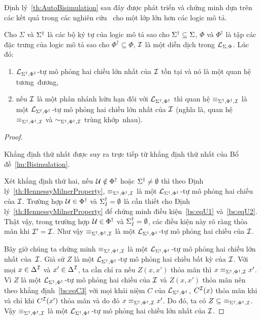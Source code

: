 Định lý~\ref{th:AutoBisimulation} sau đây được phát triển và chứng minh dựa trên các kết quả trong các nghiên cứu~\cite{Divroodi2011B,Nguyen2013} cho một lớp lớn hơn các logic mô tả.

\begin{Theorem} 
\label{th:AutoBisimulation}
	Cho $\Sigma$ và $\Sigma^\dag$ là các bộ ký tự của logic mô tả sao cho $\Sigma^\dag \subseteq \Sigma$, $\Phi$ và $\Phi^\dag$ là tập các đặc trưng của logic mô tả sao cho $\Phi^\dag \subseteq \Phi$, $\mathcal{I}$ là một diễn dịch trong $\mathcal{L}_{\Sigma,\Phi}$. Lúc đó:
	\begin{enumerate}
		\item $\mathcal{L}_{\Sigma^\dag,\Phi^\dag}$-tự mô phỏng hai chiều lớn nhất của $\mathcal{I}$ tồn tại và nó là một quan hệ tương~đương,\label{th:AutoBisimulation-item1}  
		\item nếu $\mathcal{I}$ là một phân nhánh hữu hạn đối với $\mathcal{L}_{\Sigma^\dag,\Phi^\dag}$ thì quan hệ $\equiv_{\Sigma^\dag,\Phi^\dag,\mathcal{I}}$ là một $\mathcal{L}_{\Sigma^\dag,\Phi^\dag}$-tự mô phỏng hai chiều lớn nhất của $\mathcal{I}$ (nghĩa là, quan hệ $\equiv_{\Sigma^\dag,\Phi^\dag,\mathcal{I}}$ và $\sim_{\Sigma^\dag,\Phi^\dag,\mathcal{I}}$ trùng khớp~nhau).\label{th:AutoBisimulation-item2}
	\end{enumerate}
\end{Theorem}

\begin{proof}~

\semiItem Khẳng định thứ nhất được suy ra trực tiếp từ khẳng định thứ nhất của Bổ đề~\ref{lm:Bisimulation}.

\semiItem Xét khẳng định thứ hai, nếu $\mathcal{U} \notin \Phi^\dag$ hoặc $\Sigma^\dag \not= \emptyset$ thì theo Định lý~\ref{th:HennessyMilnerProperty}, $\equiv_{\Sigma^\dag,\Phi^\dag,\mathcal{I}}$ là một $\mathcal{L}_{\Sigma^\dag,\Phi^\dag}$-tự mô phỏng hai chiều của $\mathcal{I}$.
Trường hợp $\mathcal{U} \in \Phi^\dag$ và $\Sigma^\dag_I = \emptyset$
là cần thiết cho Định lý~\ref{th:HennessyMilnerProperty} để chứng minh điều kiện~\eqref{bs:eqU1} và~\eqref{bs:eqU2}. Thật vậy, trong trường hợp $\mathcal{U} \in \Phi^\dag$ và $\Sigma^\dag_I = \emptyset$, các điều kiện này rõ ràng thỏa mãn khi $\mathcal{I}' = \mathcal{I}$. Như vậy $\equiv_{\Sigma^\dag,\Phi^\dag,\mathcal{I}}$ là một $\mathcal{L}_{\Sigma^\dag,\Phi^\dag}$-tự mô phỏng hai chiều của $\mathcal{I}$.

Bây giờ chúng ta chứng minh $\equiv_{\Sigma^\dag,\Phi^\dag,\mathcal{I}}$ là một $\mathcal{L}_{\Sigma^\dag,\Phi^\dag}$-tự mô phỏng hai chiều lớn nhất của~$\mathcal{I}$. Giả sử $Z$ là một $\mathcal{L}_{\Sigma^\dag,\Phi^\dag}$-tự mô phỏng hai chiều bất kỳ của $\mathcal{I}$. Với mọi $x \in \Delta^{\mathcal{I}}$ và $x' \in \Delta^{\mathcal{I}}$, ta cần chỉ ra nếu $Z(x,x')$ thỏa mãn thì $x \equiv_{\Sigma^\dag,\Phi^\dag,\mathcal{I}} x'$. Vì $Z$ là một $\mathcal{L}_{\Sigma^\dag,\Phi^\dag}$-tự mô phỏng hai chiều của $\mathcal{I}$ và $Z(x,x')$ thỏa mãn nên theo khẳng định~\eqref{bs:eqC3} với mọi khái niệm $C$ của $\mathcal{L}_{\Sigma^\dag,\Phi^\dag}$, $C^{\mathcal{I}}(x)$ thỏa mãn khi và chỉ khi $C^{\mathcal{I}}(x')$ thỏa mãn và do đó $x \equiv_{\Sigma^\dag,\Phi^\dag,\mathcal{I}} x'$. Do đó, ta có $Z \subseteq\ \equiv_{\Sigma^\dag,\Phi^\dag,\mathcal{I}}$. Vậy $\equiv_{\Sigma^\dag,\Phi^\dag,\mathcal{I}}$ là một $\mathcal{L}_{\Sigma^\dag,\Phi^\dag}$-tự mô phỏng hai chiều lớn nhất của $\mathcal{I}$.
\end{proof}

